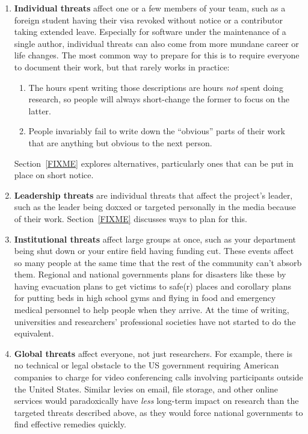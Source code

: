 \documentclass[10pt,letterpaper]{article}
\begin{document}
\begin{enumerate}
\item
  \textbf{Individual threats} affect one or a few members of your team,
  such as a foreign student having their visa revoked without notice
  or a contributor taking extended leave.
  Especially for software under the maintenance of a single author,
  individual threats can also come from more mundane career or life changes.
  The most common way to prepare for this is to require everyone to document their work,
  but that rarely works in practice:
  \begin{enumerate}
  \item
    The hours spent writing those descriptions are hours \emph{not} spent doing research,
    so people will always short-change the former to focus on the latter.
  \item
    People invariably fail to write down the ``obvious'' parts of their work
    that are anything but obvious to the next person.
  \end{enumerate}
  Section~\ref{FIXME} explores alternatives,
  particularly ones that can be put in place on short notice.

\item
  \textbf{Leadership threats} are individual threats that affect the project's leader,
  such as the leader being doxxed or targeted personally in the media because of their work.
  Section~\ref{FIXME} discusses ways to plan for this.

\item
  \textbf{Institutional threats} affect large groups at once,
  such as your department being shut down
  or your entire field having funding cut.
  These events affect so many people at the same time
  that the rest of the community can't absorb them.
  Regional and national governments plans for disasters like these
  by having evacuation plans to get victims to safe(r) places
  and corollary plans for putting beds in high school gyms
  and flying in food and emergency medical personnel to help people when they arrive.
  At the time of writing,
  universities and researchers' professional societies have not started to do the equivalent.

\item
  \textbf{Global threats} affect everyone,
  not just researchers.
  For example,
  there is no technical or legal obstacle to the US government
  requiring American companies to charge for video conferencing calls
  involving participants outside the United States.
  Similar levies on email,
  file storage,
  and other online services would paradoxically have \emph{less} long-term impact on research
  than the targeted threats described above,
  as they would force national governments to find effective remedies quickly.

\end{enumerate}
\end{document}
